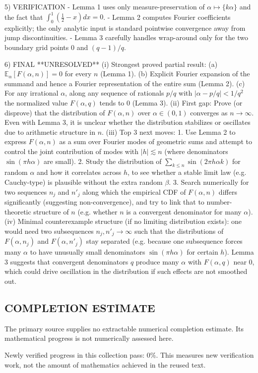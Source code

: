 5) VERIFICATION
- Lemma 1 uses only measure-preservation of $\alpha\mapsto\{k\alpha\}$ and the fact that $\int_0^1(\frac12-x)dx=0$.
- Lemma 2 computes Fourier coefficients explicitly; the only analytic input is standard pointwise convergence away from jump discontinuities.
- Lemma 3 carefully handles wrap-around only for the two boundary grid points $0$ and $(q-1)/q$.

6) FINAL
**UNRESOLVED**
(i) Strongest proved partial result: (a) $\mathbb{E}_\alpha[F(\alpha,n)]=0$ for every $n$ (Lemma 1). (b) Explicit Fourier expansion of the summand and hence a Fourier representation of the entire sum (Lemma 2). (c) For any irrational $\alpha$, along any sequence of rationals $p/q$ with $|\alpha-p/q|<1/q^2$ the normalized value $F(\alpha,q)$ tends to $0$ (Lemma 3).
(ii) First gap: Prove (or disprove) that the distribution of $F(\alpha,n)$ over $\alpha\in(0,1)$ converges as $n\to\infty$.  Even with Lemma 3, it is unclear whether the distribution stabilizes or oscillates due to arithmetic structure in $n$.
(iii) Top 3 next moves:
  1. Use Lemma 2 to express $F(\alpha,n)$ as a sum over Fourier modes of geometric sums and attempt to control the joint contribution of modes with $|h|\lesssim n$ (where denominators $\sin(\pi h\alpha)$ are small).
  2. Study the distribution of $\sum_{k\le n} \sin(2\pi h\alpha k)$ for random $\alpha$ and how it correlates across $h$, to see whether a stable limit law (e.g. Cauchy-type) is plausible without the extra random $\beta$.
  3. Search numerically for two sequences $n_j$ and $n'_j$ along which the empirical CDF of $F(\alpha,n)$ differs significantly (suggesting non-convergence), and try to link that to number-theoretic structure of $n$ (e.g. whether $n$ is a convergent denominator for many $\alpha$).
(iv) Minimal counterexample structure (if no limiting distribution exists): one would need two subsequences $n_j,n'_j\to\infty$ such that the distributions of $F(\alpha,n_j)$ and $F(\alpha,n'_j)$ stay separated (e.g. because one subsequence forces many $\alpha$ to have unusually small denominators $\sin(\pi h\alpha)$ for certain $h$).  Lemma 3 suggests that convergent denominators $q$ produce many $\alpha$ with $F(\alpha,q)$ near $0$, which could drive oscillation in the distribution if such effects are not smoothed out.


\subsection*{COMPLETION ESTIMATE}
The primary source supplies no extractable numerical completion estimate. Its mathematical progress is not numerically assessed here.

Newly verified progress in this collection pass: $0\%$. This measures new verification work, not the amount of mathematics achieved in the reused text.
